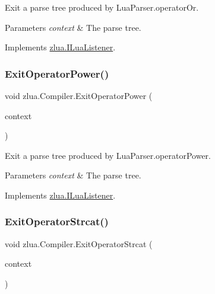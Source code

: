 Exit a parse tree produced by Lua\+Parser.\+operator\+Or. 


\begin{DoxyParams}{Parameters}
{\em context} & The parse tree.\\
\hline
\end{DoxyParams}


Implements \mbox{\hyperlink{interfacezlua_1_1_i_lua_listener_adf5acf7049bb52ab0840b23bd5038a0a}{zlua.\+I\+Lua\+Listener}}.

\mbox{\label{classzlua_1_1_compiler_a5c623270aa4a3005cf103f95ff8566a7}} 
\subsubsection{\texorpdfstring{Exit\+Operator\+Power()}{ExitOperatorPower()}}
{\footnotesize\ttfamily void zlua.\+Compiler.\+Exit\+Operator\+Power (\begin{DoxyParamCaption}\item[{\mbox{[}\+Not\+Null\mbox{]} \mbox{\hyperlink{classzlua_1_1_lua_parser_1_1_operator_power_context}{Lua\+Parser.\+Operator\+Power\+Context}}}]{context }\end{DoxyParamCaption})}



Exit a parse tree produced by Lua\+Parser.\+operator\+Power. 


\begin{DoxyParams}{Parameters}
{\em context} & The parse tree.\\
\hline
\end{DoxyParams}


Implements \mbox{\hyperlink{interfacezlua_1_1_i_lua_listener_a9047288a8f7ec003bff25c26b1d2984d}{zlua.\+I\+Lua\+Listener}}.

\mbox{\label{classzlua_1_1_compiler_a320c32704688e1ba4705eb347b0e5701}} 
\subsubsection{\texorpdfstring{Exit\+Operator\+Strcat()}{ExitOperatorStrcat()}}
{\footnotesize\ttfamily void zlua.\+Compiler.\+Exit\+Operator\+Strcat (\begin{DoxyParamCaption}\item[{\mbox{[}\+Not\+Null\mbox{]} \mbox{\hyperlink{classzlua_1_1_lua_parser_1_1_operator_strcat_context}{Lua\+Parser.\+Operator\+Strcat\+Context}}}]{context }\end{DoxyParamCaption})}




